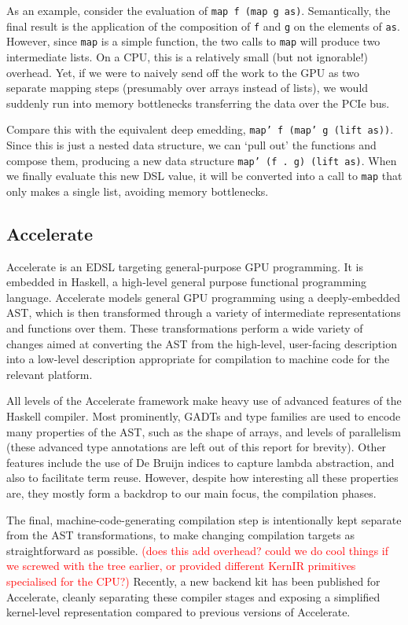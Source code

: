 \documentclass[a4paper,12pt]{article}
\newcommand{\red}[1]{\textcolor{red}{#1}}
\newcommand{\icf}[1]{\mbox{\texttt{#1}}} %
\begin{document}
As an example, consider the evaluation of \icf{map\ f\ (map\ g\ as)}. 
Semantically, the final result is the application of the composition of \icf{f} and \icf{g} on the elements of \icf{as}. 
However, since \icf{map} is a simple function, the two calls to \icf{map} will produce two intermediate lists. 
On a CPU, this is a relatively small (but not ignorable!) overhead. \citep{rompf_optimizing_2013}
Yet, if we were to naively send off the work to the GPU as two separate mapping steps (presumably over arrays instead of lists), we would suddenly run into memory bottlenecks transferring the data over the PCIe bus.

Compare this with the equivalent deep emedding, \icf{map'\ f\ (map'\ g\ (lift\ as))}. 
Since this is just a nested data structure, we can `pull out' the functions and compose them, producing a new data structure \icf{map'\ (f\ .\ g)\ (lift\ as)}.
When we finally evaluate this new DSL value, it will be converted into a call to \icf{map} that only makes a single list, avoiding memory bottlenecks.

\subsection{Accelerate}

Accelerate is an EDSL targeting general-purpose GPU programming. 
It is embedded in Haskell, a high-level general purpose functional programming language.
Accelerate models general GPU programming using a deeply-embedded AST, which is then transformed through a variety of intermediate representations and functions over them.
These transformations perform a wide variety of changes aimed at converting the AST from the high-level, user-facing description into a low-level description appropriate for compilation to machine code for the relevant platform.

All levels of the Accelerate framework make heavy use of advanced features of the Haskell compiler.
Most prominently, GADTs and type families are used to encode many properties of the AST, such as the shape of arrays, and levels of parallelism (these advanced type annotations are left out of this report for brevity).
Other features include the use of De Bruijn indices to capture lambda abstraction, and also to facilitate term reuse.
However, despite how interesting all these properties are, they mostly form a backdrop to our main focus, the compilation phases.

The final, machine-code-generating compilation step is intentionally kept separate from the AST transformations, to make changing compilation targets as straightforward as possible.
\red{(does this add overhead? could we do cool things if we screwed with the tree earlier, or provided different KernIR primitives specialised for the CPU?)}
Recently, a new backend kit has been published for Accelerate, cleanly separating these compiler stages and exposing a simplified kernel-level representation compared to previous versions of Accelerate.
\end{document}
